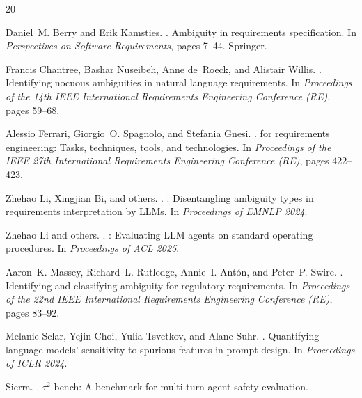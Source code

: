 \documentclass[11pt,a4paper]{article}
\begin{document}
\begin{thebibliography}{20}

Daniel~M. Berry and Erik Kamsties.
.
\newblock Ambiguity in requirements specification.
\newblock In \emph{Perspectives on Software Requirements}, pages 7--44. Springer.

Francis Chantree, Bashar Nuseibeh, Anne de~Roeck, and Alistair Willis.
.
\newblock Identifying nocuous ambiguities in natural language requirements.
\newblock In \emph{Proceedings of the 14th IEEE International Requirements Engineering Conference (RE)}, pages 59--68.

Alessio Ferrari, Giorgio~O. Spagnolo, and Stefania Gnesi.
.
 for requirements engineering: Tasks, techniques, tools, and technologies.
\newblock In \emph{Proceedings of the IEEE 27th International Requirements Engineering Conference (RE)}, pages 422--423.

Zhehao Li, Xingjian Bi, and others.
.
: Disentangling ambiguity types in requirements interpretation by {LLMs}.
\newblock In \emph{Proceedings of EMNLP 2024}.

Zhehao Li and others.
.
: Evaluating {LLM} agents on standard operating procedures.
\newblock In \emph{Proceedings of ACL 2025}.

Aaron~K. Massey, Richard~L. Rutledge, Annie~I. Ant\'on, and Peter~P. Swire.
.
\newblock Identifying and classifying ambiguity for regulatory requirements.
\newblock In \emph{Proceedings of the 22nd IEEE International Requirements Engineering Conference (RE)}, pages 83--92.

Melanie Sclar, Yejin Choi, Yulia Tsvetkov, and Alane Suhr.
.
\newblock Quantifying language models' sensitivity to spurious features in prompt design.
\newblock In \emph{Proceedings of ICLR 2024}.

Sierra.
.
\newblock $\tau^2$-bench: A benchmark for multi-turn agent safety evaluation.

\end{thebibliography}
\end{document}
